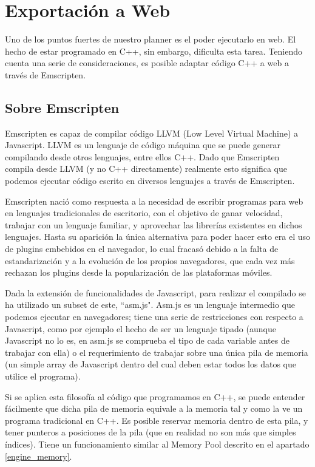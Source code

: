 \label{emscripten}
\section{Exportación a Web}
Uno de los puntos fuertes de nuestro planner es el poder ejecutarlo en web. El hecho de estar programado en C++, sin embargo, dificulta esta tarea. Teniendo cuenta una serie de consideraciones, es posible adaptar código C++ a web a través de Emscripten.

\subsection{Sobre Emscripten}
Emscripten es capaz de compilar código LLVM (Low Level Virtual Machine) a Javascript. LLVM es un lenguaje de código máquina que se puede generar compilando desde otros lenguajes, entre ellos C++. Dado que Emscripten compila desde LLVM (y no C++ directamente) realmente esto significa que podemos ejecutar código escrito en diversos lenguajes a través de Emscripten.

Emscripten nació como respuesta a la necesidad de escribir programas para web en lenguajes tradicionales de escritorio, con el objetivo de ganar velocidad, trabajar con un lenguaje familiar, y aprovechar las librerías existentes en dichos lenguajes. Hasta su aparición la única alternativa para poder hacer esto era el uso de plugins embebidos en el navegador, lo cual fracasó debido a la falta de estandarización y a la evolución de los propios navegadores, que cada vez más rechazan los plugins desde la popularización de las plataformas móviles.

Dada la extensión de funcionalidades de Javascript, para realizar el compilado se ha utilizado un subset de este, ``asm.js". Asm.js es un lenguaje intermedio que podemos ejecutar en navegadores; tiene una serie de restricciones con respecto a Javascript, como por ejemplo el hecho de ser un lenguaje tipado (aunque Javascript no lo es, en asm.js se comprueba el tipo de cada variable antes de trabajar con ella) o el requerimiento de trabajar sobre una única pila de memoria (un simple array de Javascript dentro del cual deben estar todos los datos que utilice el programa).

Si se aplica esta filosofía al código que programamos en C++, se puede entender fácilmente que dicha pila de memoria equivale a la memoria tal y como la ve un programa tradicional en C++. Es posible reservar memoria dentro de esta pila, y tener punteros a posiciones de la pila (que en realidad no son más que simples índices). Tiene un funcionamiento similar al Memory Pool descrito en el apartado \ref{engine_memory}.

